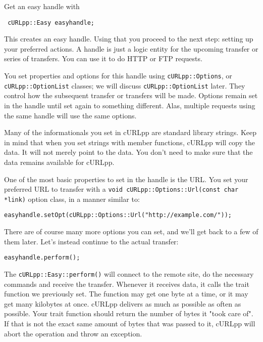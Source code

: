 \documentclass{article}
\begin{document}
Get an easy handle with

\begin{verbatim} cURLpp::Easy easyhandle;\end{verbatim}

This creates an easy handle. Using that you proceed to the next step: setting
up your preferred actions. A handle is just a logic entity for the upcoming
transfer or series of transfers. You can use it to do HTTP or FTP 
requests.

You set properties and options for this handle using \verb+cURLpp::Options+, 
or \verb+cURLpp::OptionList+ classes; we will discuss \verb+cURLpp::OptionList+
later. They control how the subsequent transfer or transfers will be made. 
Options remain set in the handle until set again to something different. 
Alas, multiple requests using the same handle will use the same options.

Many of the informationals you set in cURLpp are \Cpp standard library strings. 
Keep in mind that when you set strings with member functions, cURLpp will copy 
the data. It will not merely point to the data. You don't need to make sure 
that the data remains available for cURLpp.

One of the most basic properties to set in the handle is the URL. You set
your preferred URL to transfer with a 
\verb+void cURLpp::Options::Url(const char *link)+
option class, in a manner similar to:

\begin{verbatim} 
easyhandle.setOpt(cURLpp::Options::Url("http://example.com/"));
\end{verbatim}

There are of course many more options you can set, and we'll get back to a
few of them later. Let's instead continue to the actual transfer:

\begin{verbatim}
easyhandle.perform();
\end{verbatim}

The \verb+cURLpp::Easy::perform()+ will connect to the remote site, do the necessary
commands and receive the transfer. Whenever it receives data, it calls the
trait function we previously set. The function may get one byte at a time,
or it may get many kilobytes at once. cURLpp delivers as much as possible as
often as possible. Your trait function should return the number of bytes
it "took care of". If that is not the exact same amount of bytes that was
passed to it, cURLpp will abort the operation and throw an exception.
\end{document}
